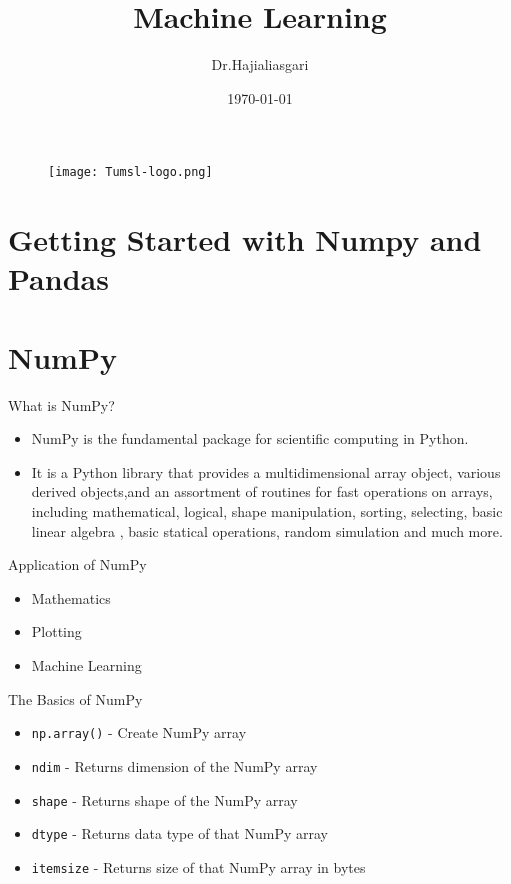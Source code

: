 \documentclass[serif, aspectratio=169]{beamer}
\author{Dr.Hajialiasgari}
\title{Machine Learning}
\institute{
    Tehran University \\
    Of\\
    Medical Science
}
\date{\small \today}
\begin{document}
\begin{frame}
    \titlepage
    \vspace*{-0.6cm}
    \begin{figure}[htpb]
        \begin{center}
            \texttt{[image: Tumsl-logo.png]}
        \end{center}
    \end{figure}
\end{frame}

\begin{frame}    
\tableofcontents[sectionstyle=show, subsectionstyle=show/shaded/hide, subsubsectionstyle=show/shaded/hide]
\end{frame}

\section{Getting Started with \newline
Numpy and Pandas}
\section{NumPy}
\begin{frame}{What is NumPy?}
    \begin{itemize}
        \item NumPy is the fundamental package for scientific computing in Python.
        \item It is a Python library that provides a multidimensional array object, various derived objects,and an assortment of routines for fast operations on arrays, including mathematical, logical, shape manipulation, sorting, selecting, basic linear algebra , basic statical operations, random simulation and much more.
    \end{itemize}
\end{frame}

\begin{frame}{Application of NumPy}
    \begin{itemize}
        \item Mathematics
        \item Plotting
        \item Machine Learning
    \end{itemize}
\end{frame}

\begin{frame}{The Basics of NumPy}
    \begin{itemize}
       \item \texttt{\color{red}np.array()} - Create NumPy array
       \item \texttt{\color{red}ndim} - Returns dimension of the NumPy array
       \item \texttt{\color{red}shape} - Returns shape of the NumPy array
       \item \texttt{\color{red}dtype} - Returns data type of that NumPy array
       \item \texttt{\color{red}itemsize} - Returns size of that NumPy array in bytes
    \end{itemize}
\end{frame}
\end{document}
